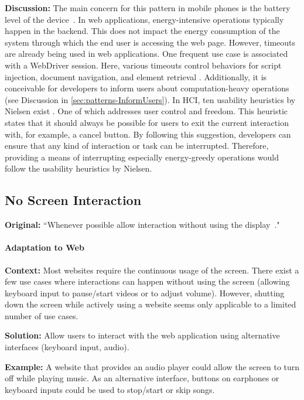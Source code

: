 \textbf{Discussion:} The main concern for this pattern in mobile phones is the battery level of the device~\cite{cruz2019catalog}. In web applications, energy-intensive operations typically happen in the backend. This does not impact the energy consumption of the system through which the end user is accessing the web page. 
However, timeouts are already being used in web applications. One frequent use case is associated with a WebDriver session. Here, various timeouts control behaviors for script injection, document navigation, and element retrieval \cite{dev-mozilla-timeouts}.  Additionally, it is conceivable for developers to inform users about computation-heavy operations (see Discussion in \ref{sec:patterns-InformUsers}). In HCI, ten usability heuristics by Nielsen exist \cite{nielsen1995ten}. One of which addresses user control and freedom. This heuristic states that it should always be possible for users to exit the current interaction with, for example, a cancel button. By following this suggestion, developers can ensure that any kind of interaction or task can be interrupted. Therefore, providing a means of interrupting especially energy-greedy operations would follow the usability heuristics by Nielsen.


\subsection{No Screen Interaction} \label{sec:patterns-NoScreenInteraction}
\textbf{Original:} ``Whenever possible allow interaction without using the display~\cite{cruz2019catalog}."

\paragraph{Adaptation to Web}\mbox{}

\textbf{Context:} Most websites require the continuous usage of the screen. There exist a few use cases where interactions can happen without using the screen (\eg allowing keyboard input to pause/start videos or to adjust volume). However, shutting down the screen while actively using a website seems only applicable to a limited number of use cases.

\textbf{Solution:} Allow users to interact with the web application using alternative interfaces (\eg keyboard input, audio).

\textbf{Example:} A website that provides an audio player could allow the screen to turn off while playing music. As an alternative interface, buttons on earphones or keyboard inputs could be used to stop/start or skip songs.

